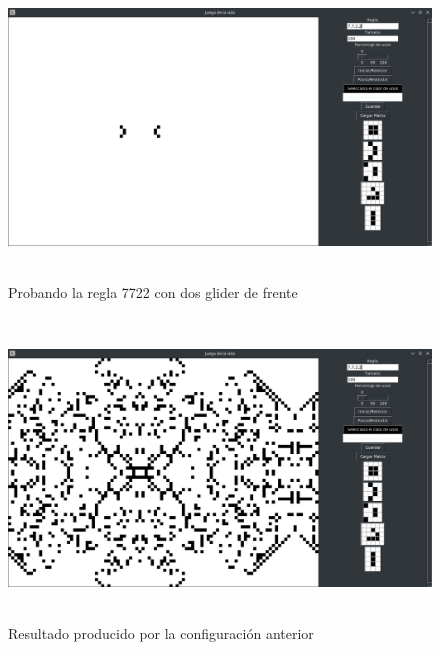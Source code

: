 \begin{figure}[H]
\begin{center}
 \includegraphics[width=12cm, height=8cm]{./img/inicio.png}
 \caption{Probando la regla 7722 con dos glider de frente}
 \label{fig:inicio}
\end{center}
\end{figure}

\begin{figure}[H]
\begin{center}
 \includegraphics[width=12cm, height=8cm]{./img/final.png}
 \caption{Resultado producido por la configuración anterior}
 \label{fig:final}
\end{center}
\end{figure}



